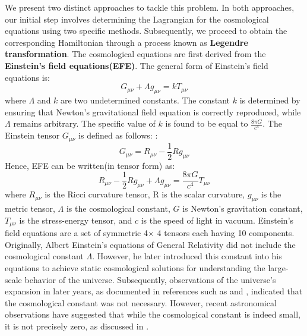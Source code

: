 \documentclass[12pt]{article}
\begin{document}
We present two distinct approaches to tackle this problem. In both approaches, our initial step involves determining the Lagrangian for the cosmological equations using two specific methods. Subsequently, we proceed to obtain the corresponding Hamiltonian through a process known as \textbf{Legendre transformation}.
\newline 
The cosmological equations are first derived from the \textbf{Einstein's field equations(EFE)}. The general form of Einstein's field equations is:
\begin{equation}
G_{\mu \nu}+\Lambda g_{\mu \nu}=k T_{\mu \nu}
\end{equation}
where $\Lambda$ and $k$ are two undetermined constants. The constant $k$ is determined by ensuring that Newton's gravitational field equation is correctly reproduced, while $\Lambda$ remains arbitrary. The specific value of $k$ is found to be equal to $\frac{8 \pi G}{c^{4}}$.
The Einstein tensor $G_{\mu \nu}$ is defined as follows: :
\begin{equation}
G_{\mu \nu}=R_{\mu \nu}-\frac{1}{2} R g_{\mu \nu}
\end{equation}
Hence, EFE can be written(in tensor form) as:
\begin{equation}
R_{\mu \nu}-\frac{1}{2} R g_{\mu \nu}+\Lambda g_{\mu \nu}=\frac{8 \pi G}{c^{4}} T_{\mu \nu}
\end{equation}
where $R_{\mu \nu}$ is the Ricci curvature tensor, R is the scalar curvature, $g_{\mu \nu}$ is the metric tensor, $\Lambda$ is the cosmological constant, $G$ is Newton's gravitation constant, $T_{\mu \nu}$ is the stress-energy tensor, and $c$ is the speed of light in vacuum. Einstein's field equations are a set of symmetric 4$\times$ 4 tensors each having 10 components.\\
Originally, Albert Einstein's equations of General Relativity did not include the cosmological constant $\Lambda$. However, he later introduced this constant into his equations to achieve static cosmological solutions for understanding the large-scale behavior of the universe. Subsequently, observations of the universe's expansion in later years, as documented in references such as \cite{Riess_1998} and \cite{Perlmutter_1999}, indicated that the cosmological constant was not necessary. However, recent astronomical observations have suggested that while the cosmological constant is indeed small, it is not precisely zero, as discussed in \cite{Bousso_2007}. 
\end{document}
